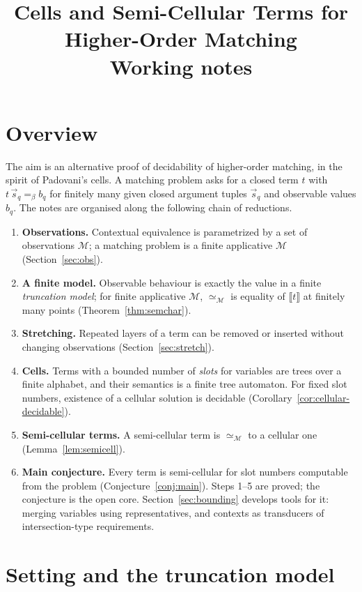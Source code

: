 \documentclass[11pt]{article}
\title{Cells and Semi-Cellular Terms for Higher-Order Matching\\
       \large Working notes}
\author{}
\date{}
\newcommand{\ObsEq}{\mathrel{\simeq}\xspace}
\newcommand{\sem}[1]{\llbracket #1\rrbracket}
\theoremstyle{definition}
\begin{document}
\maketitle

\section{Overview}

The aim is an alternative proof of decidability of higher-order matching,
in the spirit of Padovani's cells.  A matching problem asks for a closed
term $t$ with $t\,\vec s_q=_\beta b_q$ for finitely many given closed
argument tuples $\vec s_q$ and observable values $b_q$.  The notes are
organised along the following chain of reductions.

\begin{enumerate}
\item \textbf{Observations.}  Contextual equivalence is parametrized by a
  set of observations $\mathcal M$; a matching problem is a finite
  applicative $\mathcal M$ (Section~\ref{sec:obs}).
\item \textbf{A finite model.}  Observable behaviour is exactly the value
  in a finite \emph{truncation model}; for finite applicative $\mathcal M$,
  $\ObsEq_{\mathcal M}$ is equality of $\sem t$ at finitely many points
  (Theorem~\ref{thm:semchar}).
\item \textbf{Stretching.}  Repeated layers of a term can be removed or
  inserted without changing observations (Section~\ref{sec:stretch}).
\item \textbf{Cells.}  Terms with a bounded number of \emph{slots} for
  variables are trees over a finite alphabet, and their semantics is a
  finite tree automaton.  For fixed slot numbers, existence of a cellular
  solution is decidable (Corollary~\ref{cor:cellular-decidable}).
\item \textbf{Semi-cellular terms.}  A semi-cellular term is
  $\ObsEq_{\mathcal M}$ to a cellular one (Lemma~\ref{lem:semicell}).
\item \textbf{Main conjecture.}  Every term is semi-cellular for slot
  numbers computable from the problem (Conjecture~\ref{conj:main}).
  Steps 1--5 are proved; the conjecture is the open core.
  Section~\ref{sec:bounding} develops tools for it: merging variables
  using representatives, and contexts as transducers of intersection-type
  requirements.
\end{enumerate}

\section{Setting and the truncation model}\label{sec:setting}
\end{document}
